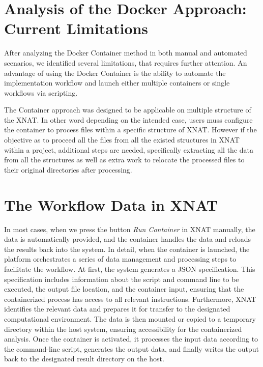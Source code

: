\section{Analysis of the Docker Approach: Current Limitations}

After analyzing the Docker Container method in both manual and automated scenarios, we identified several limitations, that requires further attention.
An advantage of using the Docker Container is the ability to automate the implementation workflow and launch either multiple containers or single workflows via scripting.

The Container approach was designed to be applicable on multiple structure of the XNAT. In other word depending on the intended case, users muss configure the container to process files within a specific structure of XNAT. However if the objective as to proceed all the files from all the existed structures in XNAT within a project, additional steps are needed, specifically extracting all the data from all the structures as well as extra work to relocate the processed files to their original directories after processing. 

\section{The Workflow Data in XNAT}

In most cases, when we press the button \textit{Run Container} in XNAT manually, the data is automatically provided, and the container handles the data and reloads the results back into the system.  
In detail, when the container is launched, the platform orchestrates a series of data management and processing steps to facilitate the workflow. At first, the system generates a JSON specification. This specification includes information about the script and command line to be executed, the output file location, and the container input, ensuring that the containerized process has access to all relevant instructions.  
Furthermore, XNAT identifies the relevant data and prepares it for transfer to the designated computational environment. The data is then mounted or copied to a temporary directory within the host system, ensuring accessibility for the containerized analysis. Once the container is activated, it processes the input data according to the command-line script, generates the output data, and finally writes the output back to the designated result directory on the host.  

